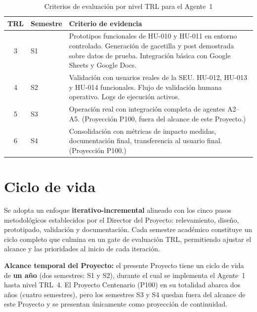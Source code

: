 \documentclass[a4paper, 12pt]{article}
\begin{document}
\begin{table}[H]
  \centering
  \caption{Criterios de evaluaci\'on por nivel TRL para el Agente~1}
  \label{tab:trl-criterios}
  \begin{tabularx}{\textwidth}{clX}
    \toprule
    \textbf{TRL} & \textbf{Semestre} & \textbf{Criterio de evidencia} \\
    \midrule
    3 & S1 & Prototipos funcionales de HU-010 y HU-011 en entorno controlado. Generaci\'on de gacetilla y post demostrada sobre datos de prueba. Integraci\'on b\'asica con Google Sheets y Google Docs. \\
    4 & S2 & Validaci\'on con usuarios reales de la \ac{SEU}. HU-012, HU-013 y HU-014 funcionales. Flujo de validaci\'on humana operativo. Logs de ejecuci\'on activos. \\
    5 & S3 & Operaci\'on real con integraci\'on completa de agentes A2--A5. (Proyecci\'on P100, fuera del alcance de este Proyecto.) \\
    6 & S4 & Consolidaci\'on con m\'etricas de impacto medidas, documentaci\'on final, transferencia al usuario final. (Proyecci\'on P100.) \\
    \bottomrule
  \end{tabularx}
\end{table}

\section{Ciclo de vida}

Se adopta un enfoque \textbf{iterativo-incremental} alineado con los cinco pasos metodol\'ogicos establecidos por el Director del Proyecto: relevamiento, dise\~no, prototipado, validaci\'on y documentaci\'on. Cada semestre acad\'emico constituye un ciclo completo que culmina en un gate de evaluaci\'on \ac{TRL}, permitiendo ajustar el alcance y las prioridades al inicio de cada iteraci\'on.

\textbf{Alcance temporal del Proyecto:} el presente Proyecto tiene un ciclo de vida de \textbf{un a\~no} (dos semestres: S1 y S2), durante el cual se implementa el Agente~1 hasta nivel TRL~4. El Proyecto Centenario (\ac{P100}) en su totalidad abarca dos a\~nos (cuatro semestres), pero los semestres S3 y S4 quedan fuera del alcance de este Proyecto y se presentan \'unicamente como proyecci\'on de continuidad.
\end{document}

